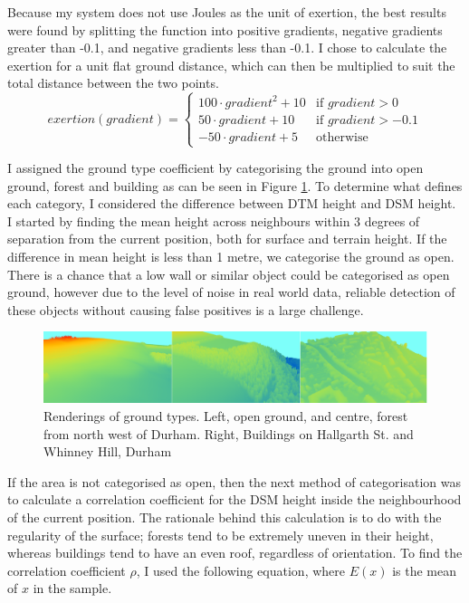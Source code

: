 \documentclass[12pt,a4paper]{article}
\begin{document}
  \par Because my system does not use Joules as the unit of exertion, the best results were found by splitting the function into positive gradients, negative gradients greater than -0.1, and negative gradients less than -0.1. I chose to calculate the exertion for a unit flat ground distance, which can then be multiplied to suit the total distance between the two points.
  \begin{equation*}
    exertion(gradient) = \begin{cases}
      100 \cdot gradient^{2} + 10 & \text{if $gradient > 0$}\\
      50 \cdot gradient + 10 & \text{if $gradient > -0.1$}\\
      -50 \cdot gradient + 5 & \text{otherwise}
    \end{cases}
  \end{equation*}

  \par I assigned the ground type coefficient by categorising the ground into open ground, forest and building as can be seen in Figure \ref{ground_types}. To determine what defines each category, I considered the difference between DTM height and DSM height. I started by finding the mean height across neighbours within 3 degrees of separation from the current position, both for surface and terrain height. If the difference in mean height is less than 1 metre, we categorise the ground as open. There is a chance that a low wall or similar object could be categorised as open ground, however due to the level of noise in real world data, reliable detection of these objects without causing false positives is a large challenge.

  \begin{figure}[htb]
    \centering
    \includegraphics[width=\textwidth]{ground_types}
    \caption{Renderings of ground types. Left, open ground, and centre, forest from north west of Durham. Right, Buildings on Hallgarth St. and Whinney Hill, Durham}
    \label{ground_types}
  \end{figure}

  \par If the area is not categorised as open, then the next method of categorisation was to calculate a correlation coefficient for the DSM height inside the neighbourhood of the current position. The rationale behind this calculation is to do with the regularity of the surface; forests tend to be extremely uneven in their height, whereas buildings tend to have an even roof, regardless of orientation. To find the correlation coefficient $\rho$, I used the following equation, where $E(x)$ is the mean of $x$ in the sample.
\end{document}
